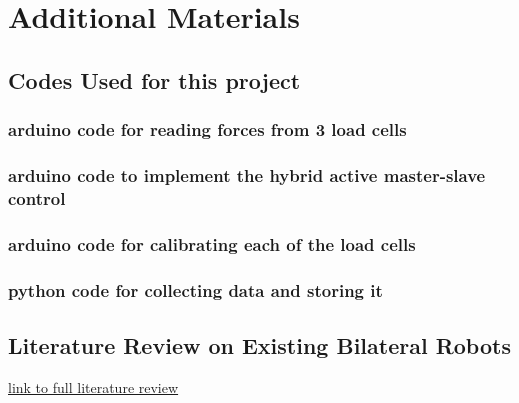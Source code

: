 
\chapter{Additional Materials}\label{ch:litrev}
\section{Codes Used for this project}
\subsection{arduino code for reading forces from 3 load cells}




\subsection{arduino code to implement the hybrid active master-slave control}



\subsection{arduino code for calibrating each of the load cells}



\newpage


\subsection{python code for collecting data and storing it}
\newpage
\restoregeometry
{} 
\section{Literature Review on Existing Bilateral Robots}\label{sec:bilatrob}
\href{https://docs.google.com/document/d/1uwM2z0r_MtfIO8P_6Rdd-_3ZBnt-zjLi/edit?usp=sharing&ouid=106338247166493930992&rtpof=true&sd=true}{link to full literature review}

